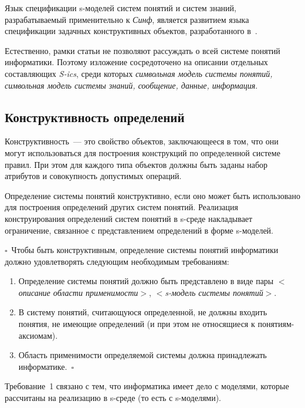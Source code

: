 \begin{multicols}{2}
Язык спецификации s-моделей
систем понятий и систем знаний, разрабатываемый применительно к \textit{Синф}, является
развитием языка спецификации задачных конструктивных объектов, разработанного
в~\cite{7il}.

Естественно, рамки статьи не позволяют рас\-суж\-дать о всей системе понятий
информатики. Поэтому изложение сосредоточено на описании отдельных
составляющих \textit{S-ics}, среди которых \textit{символьная модель системы
понятий, символьная модель системы знаний, сообщение, данные,
информация}.

\subsection{Конструктивность определений} %

Конструктивность~--- это свойство объектов, заключающееся в том, что они могут 
использоваться для построения конструкций по определенной сис\-те\-ме правил. 
При этом для каждого типа объектов должны быть заданы набор атрибутов и 
совокупность допустимых операций.

Определение системы понятий конструктивно, если оно может быть использовано для 
построения определений других систем понятий. Реализация конструирования 
определений систем понятий в \linebreak
s-сре\-де накладывает ограничение, 
связанное с представлением определений в форме s-мо\-де\-лей.

\noindent $\square$~Чтобы быть конструктивным, определение системы понятий 
информатики должно удовлетворять следующим необходимым требованиям:
\begin{enumerate}[1.]
\item Определение системы понятий должно быть представлено в виде пары
$<$\textit{описание области применимости}$>$, $<$\textit{s-модель системы
понятий}$>$.
\item В систему понятий, считающуюся определенной, не должны входить
понятия, не име\-ющие определений (и при этом не относящиеся к
понятиям-аксиомам).
\item Область применимости определяемой системы должна принадлежать
информатике.~$\square$
\end{enumerate}

Требование~1 связано с тем, что информатика имеет дело с моделями,
которые рассчитаны на реализацию в s-среде (то есть с s-моделями).


\end{multicols}
